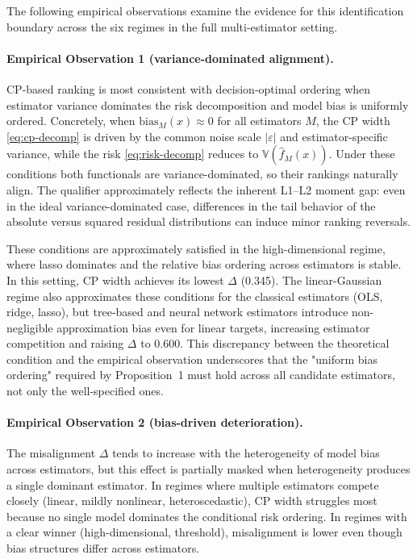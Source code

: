 \documentclass[pdflatex,sn-mathphys-ay]{sn-jnl}%
\theoremstyle{thmstyleone}%
\theoremstyle{thmstyletwo}%
\theoremstyle{thmstylethree}%
\begin{document}
The following empirical observations examine the evidence for this identification boundary across the six regimes in the full multi-estimator setting.

\paragraph{Empirical Observation 1 (variance-dominated alignment).} CP-based ranking is most consistent with decision-optimal ordering when estimator variance dominates the risk decomposition and model bias is uniformly ordered. Concretely, when $\text{bias}_M(x) \approx 0$ for all estimators $M$, the CP width \eqref{eq:cp-decomp} is driven by the common noise scale $|\varepsilon|$ and estimator-specific variance, while the risk \eqref{eq:risk-decomp} reduces to $\mathbb{V}(\hat{f}_M(x))$. Under these conditions both functionals are variance-dominated, so their rankings naturally align. The qualifier approximately reflects the inherent L1--L2 moment gap: even in the ideal variance-dominated case, differences in the tail behavior of the absolute versus squared residual distributions can induce minor ranking reversals.

These conditions are approximately satisfied in the high-dimensional regime, where lasso dominates and the relative bias ordering across estimators is stable. In this setting, CP width achieves its lowest $\Delta$ (0.345). The linear-Gaussian regime also approximates these conditions for the classical estimators (OLS, ridge, lasso), but tree-based and neural network estimators introduce non-negligible approximation bias even for linear targets, increasing estimator competition and raising $\Delta$ to 0.600. This discrepancy between the theoretical condition and the empirical observation underscores that the "uniform bias ordering" required by Proposition~1 must hold across all candidate estimators, not only the well-specified ones.

\paragraph{Empirical Observation 2 (bias-driven deterioration).} The misalignment $\Delta$ tends to increase with the heterogeneity of model bias across estimators, but this effect is partially masked when heterogeneity produces a single dominant estimator. In regimes where multiple estimators compete closely (linear, mildly nonlinear, heteroscedastic), CP width struggles most because no single model dominates the conditional risk ordering. In regimes with a clear winner (high-dimensional, threshold), misalignment is lower even though bias structures differ across estimators.
\end{document}
